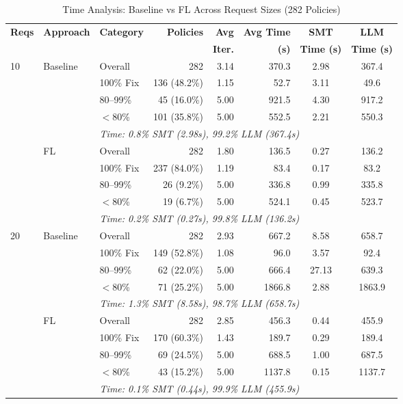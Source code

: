 \begin{table*}[t]
\centering
\caption{Time Analysis: Baseline vs FL Across Request Sizes (282 Policies)}
\label{tab:time_combined}
\begin{tabular}{lllrrrcc}
\toprule
\textbf{Reqs} & \textbf{Approach} & \textbf{Category} & \textbf{Policies} & \textbf{Avg} & \textbf{Avg Time} & \textbf{SMT} & \textbf{LLM} \\
& & & & \textbf{Iter.} & \textbf{(s)} & \textbf{Time (s)} & \textbf{Time (s)} \\
\midrule
10 & Baseline & Overall & 282 & 3.14 & 370.3 & 2.98 & 367.4 \\
 & & 100\% Fix & 136 (48.2\%) & 1.15 & 52.7 & 3.11 & 49.6 \\
 & & 80--99\% & 45 (16.0\%) & 5.00 & 921.5 & 4.30 & 917.2 \\
 & & $<$80\% & 101 (35.8\%) & 5.00 & 552.5 & 2.21 & 550.3 \\
 & & \multicolumn{6}{l}{\textit{Time: 0.8\% SMT (2.98s), 99.2\% LLM (367.4s)}} \\
\addlinespace
10 & FL & Overall & 282 & 1.80 & 136.5 & 0.27 & 136.2 \\
 & & 100\% Fix & 237 (84.0\%) & 1.19 & 83.4 & 0.17 & 83.2 \\
 & & 80--99\% & 26 (9.2\%) & 5.00 & 336.8 & 0.99 & 335.8 \\
 & & $<$80\% & 19 (6.7\%) & 5.00 & 524.1 & 0.45 & 523.7 \\
 & & \multicolumn{6}{l}{\textit{Time: 0.2\% SMT (0.27s), 99.8\% LLM (136.2s)}} \\
\midrule
20 & Baseline & Overall & 282 & 2.93 & 667.2 & 8.58 & 658.7 \\
 & & 100\% Fix & 149 (52.8\%) & 1.08 & 96.0 & 3.57 & 92.4 \\
 & & 80--99\% & 62 (22.0\%) & 5.00 & 666.4 & 27.13 & 639.3 \\
 & & $<$80\% & 71 (25.2\%) & 5.00 & 1866.8 & 2.88 & 1863.9 \\
 & & \multicolumn{6}{l}{\textit{Time: 1.3\% SMT (8.58s), 98.7\% LLM (658.7s)}} \\
\addlinespace
20 & FL & Overall & 282 & 2.85 & 456.3 & 0.44 & 455.9 \\
 & & 100\% Fix & 170 (60.3\%) & 1.43 & 189.7 & 0.29 & 189.4 \\
 & & 80--99\% & 69 (24.5\%) & 5.00 & 688.5 & 1.00 & 687.5 \\
 & & $<$80\% & 43 (15.2\%) & 5.00 & 1137.8 & 0.15 & 1137.7 \\
 & & \multicolumn{6}{l}{\textit{Time: 0.1\% SMT (0.44s), 99.9\% LLM (455.9s)}} \\

\end{tabular}
\end{table*}
